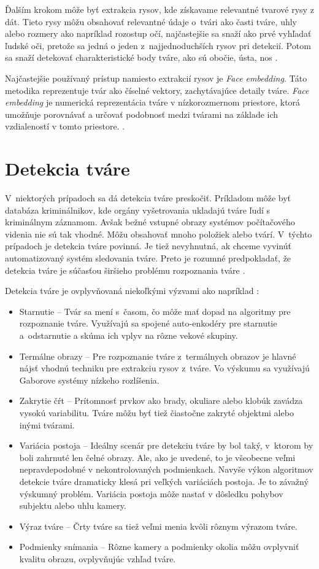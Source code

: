 Ďalším krokom môže byť extrakcia rysov, kde získavame relevantné tvarové rysy z dát. Tieto rysy môžu obsahovať relevantné údaje o~tvári ako časti tváre, uhly alebo rozmery ako napríklad rozostup očí, najčastejšie sa snaží ako prvé vyhľadať ľudské oči, pretože sa jedná o jeden z~najjednoduchších rysov pri detekcií. Potom sa snaží detekovať charakteristické body tváre, ako sú obočie, ústa, nos \cite{face_rec_algo,face_detect}. 

Najčastejšie používaný prístup namiesto extrakcií rysov je \textit{Face embedding}. Táto metodika reprezentuje tvár ako číselné vektory, zachytávajúce detaily tváre. \textit{Face embedding} je numerická reprezentácia tváre v nízkorozmernom priestore, ktorá umožňuje porovnávať a určovať podobnosť medzi tvárami na základe ich vzdialeností v tomto priestore. \cite{face_embed}.

\section{Detekcia tváre}
V~niektorých prípadoch sa dá detekcia tváre preskočiť. Príkladom môže byť databáza kriminálnikov, kde orgány vyšetrovania ukladajú tváre ľudí s kriminálnym záznamom. Avšak bežné vstupné obrazy systémov počítačového videnia nie sú tak vhodné. Môžu obsahovať mnoho položiek alebo tvárí. V~týchto prípadoch je detekcia tváre povinná. Je tiež nevyhnutná, ak chceme vyvinúť automatizovaný systém sledovania tváre. Preto je rozumné predpokladať, že detekcia tváre je súčasťou širšieho problému rozpoznania tváre \cite{face_rec_algo}.

Detekcia tváre je ovplyvňovaná niekoľkými výzvami ako napríklad \cite{face_rec_algo, AGARWAL2023223}:
\begin{itemize}
    \item Starnutie -- Tvár sa mení s~časom, čo môže mať dopad na algoritmy pre rozpoznanie tváre. Využívajú sa spojené auto-enkodéry pre starnutie a~odstarnutie a skúma ich vplyv na rôzne vekové skupiny.
    \item Termálne obrazy -- Pre rozpoznanie tváre z~termálnych obrazov je hlavné nájsť vhodnú techniku pre extrakciu rysov z~tváre. Vo výskumu sa využívajú Gaborove systémy nízkeho rozlíšenia.
    \item Zakrytie čŕt -- Prítomnosť prvkov ako brady, okuliare alebo klobúk zavádza vysokú variabilitu. Tváre môžu byť tiež čiastočne zakryté objektmi alebo inými tvárami.
    \item Variácia postoja -- Ideálny scenár pre detekciu tváre by bol taký, v~ktorom by boli zahrnuté len čelné obrazy. Ale, ako je uvedené, to je všeobecne veľmi nepravdepodobné v nekontrolovaných podmienkach. Navyše výkon algoritmov detekcie tváre dramaticky klesá pri veľkých variáciách postoja. Je to závažný výskumný problém. Variácia postoja môže nastať v dôsledku pohybov subjektu alebo uhlu kamery.
    \item Výraz tváre -- Črty tváre sa tiež veľmi menia kvôli rôznym výrazom tváre.
    \item Podmienky snímania -- Rôzne kamery a podmienky okolia môžu ovplyvniť kvalitu obrazu, ovplyvňujúc vzhľad tváre.
\end{itemize}

